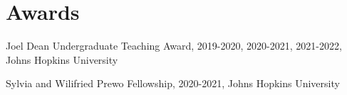 
\section{Awards} %
\label{sec:award}
\vspace{-0.25in}
\begin{outerlist}
	\item 	 Joel Dean Undergraduate Teaching Award, 2019-2020, 2020-2021, 2021-2022, Johns Hopkins University
	\item Sylvia and Wilifried Prewo Fellowship, 2020-2021, Johns Hopkins University 
\end{outerlist}